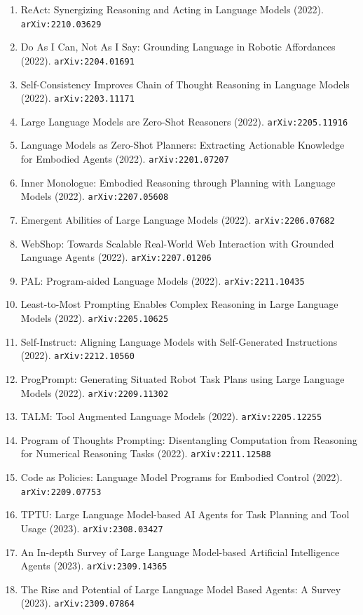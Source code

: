 \documentclass[11pt]{article}
\begin{document}
\begin{enumerate}
  \item ReAct: Synergizing Reasoning and Acting in Language Models (2022). \texttt{arXiv:2210.03629}
  \item Do As I Can, Not As I Say: Grounding Language in Robotic Affordances (2022). \texttt{arXiv:2204.01691}
  \item Self-Consistency Improves Chain of Thought Reasoning in Language Models (2022). \texttt{arXiv:2203.11171}
  \item Large Language Models are Zero-Shot Reasoners (2022). \texttt{arXiv:2205.11916}
  \item Language Models as Zero-Shot Planners: Extracting Actionable Knowledge
  for Embodied Agents (2022). \texttt{arXiv:2201.07207}
  \item Inner Monologue: Embodied Reasoning through Planning with Language
  Models (2022). \texttt{arXiv:2207.05608}
  \item Emergent Abilities of Large Language Models (2022). \texttt{arXiv:2206.07682}
  \item WebShop: Towards Scalable Real-World Web Interaction with Grounded
  Language Agents (2022). \texttt{arXiv:2207.01206}
  \item PAL: Program-aided Language Models (2022). \texttt{arXiv:2211.10435}
  \item Least-to-Most Prompting Enables Complex Reasoning in Large Language
  Models (2022). \texttt{arXiv:2205.10625}
  \item Self-Instruct: Aligning Language Models with Self-Generated Instructions (2022). \texttt{arXiv:2212.10560}
  \item ProgPrompt: Generating Situated Robot Task Plans using Large Language
  Models (2022). \texttt{arXiv:2209.11302}
  \item TALM: Tool Augmented Language Models (2022). \texttt{arXiv:2205.12255}
  \item Program of Thoughts Prompting: Disentangling Computation from Reasoning
  for Numerical Reasoning Tasks (2022). \texttt{arXiv:2211.12588}
  \item Code as Policies: Language Model Programs for Embodied Control (2022). \texttt{arXiv:2209.07753}
  \item TPTU: Large Language Model-based AI Agents for Task Planning and Tool Usage (2023). \texttt{arXiv:2308.03427}
  \item An In-depth Survey of Large Language Model-based Artificial Intelligence
  Agents (2023). \texttt{arXiv:2309.14365}
  \item The Rise and Potential of Large Language Model Based Agents: A Survey (2023). \texttt{arXiv:2309.07864}

\end{enumerate}
\end{document}
